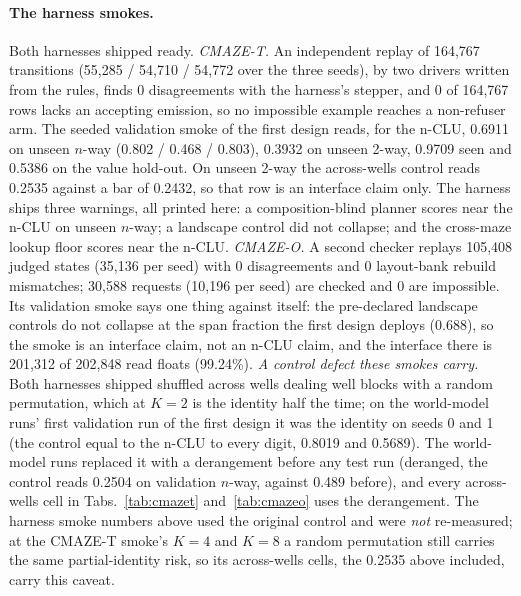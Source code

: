 \documentclass{article} %
\begin{document}
\paragraph{The harness smokes.} Both harnesses shipped ready.
\emph{CMAZE-T.} An independent replay of 164,767 transitions (55,285 / 54,710 / 54,772 over the
three seeds), by two drivers written from the rules, finds 0 disagreements with the harness's
stepper, and 0 of 164,767 rows lacks an accepting emission, so no impossible example reaches a
non-refuser arm. The seeded validation smoke of the first design reads, for the n-CLU,
0.6911 on unseen $n$-way (0.802 / 0.468 / 0.803), 0.3932 on unseen 2-way, 0.9709 seen and 0.5386
on the value hold-out. On unseen 2-way the across-wells control reads 0.2535 against a bar of
0.2432, so that row is an interface claim only. The harness ships three warnings, all printed here: a composition-blind planner scores near the
n-CLU on unseen $n$-way; a landscape control did not collapse; and the cross-maze lookup floor
scores near the n-CLU.
\emph{CMAZE-O.} A second checker replays 105,408 judged states (35,136 per seed) with 0
disagreements and 0 layout-bank rebuild mismatches; 30,588 requests (10,196 per seed) are checked
and 0 are impossible. Its validation smoke says one thing against itself: the pre-declared landscape
controls do not collapse at the span fraction the first design deploys (0.688), so the smoke is an interface claim,
not an n-CLU claim, and the interface there is 201,312 of 202,848 read floats (99.24\%).
\emph{A control defect these smokes carry.} Both harnesses shipped
shuffled across wells dealing well blocks with a random permutation, which at
$K=2$ is the identity half the time; on the world-model runs' first validation run of the first design it was
the identity on seeds 0 and 1 (the control equal to the n-CLU to every digit, 0.8019 and 0.5689).
The world-model runs replaced it with a derangement before any test run (deranged, the control
reads 0.2504 on validation $n$-way, against 0.489 before), and every across-wells cell in
Tabs.~\ref{tab:cmazet} and~\ref{tab:cmazeo} uses the derangement. The harness smoke numbers above
used the original control and were \emph{not} re-measured; at the CMAZE-T smoke's $K=4$ and $K=8$ a
random permutation still carries the same partial-identity risk, so its across-wells cells,
the 0.2535 above included, carry this caveat.
\end{document}
